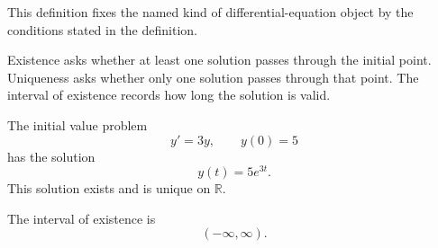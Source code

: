 \begin{remark*}
This definition fixes the named kind of differential-equation object by the
conditions stated in the definition.
\end{remark*}

\NoLocalDependencies

\begin{remark*}[Interpretation]
Existence asks whether at least one solution passes through the initial point. Uniqueness asks whether only one solution passes through that point. The interval of existence records how long the solution is valid.
\end{remark*}

\begin{example*}
The initial value problem
\[
y'=3y,
\qquad
y(0)=5
\]
has the solution
\[
y(t)=5e^{3t}.
\]
This solution exists and is unique on $\mathbb{R}$.

The interval of existence is
\[
(-\infty,\infty).
\]
\end{example*}
